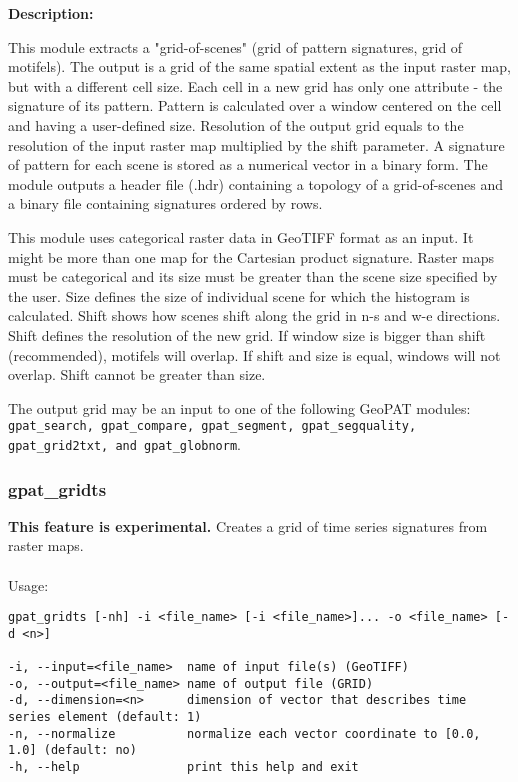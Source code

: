 {\bf Description:}

This module extracts a "grid-of-scenes" (grid of pattern signatures, grid of motifels).
The output is a grid of the same spatial extent as the input raster map, but with a different cell size.
Each cell in a new grid has only one attribute - the signature of its pattern. 
Pattern is calculated over a window centered on the cell and having a user-defined size.
Resolution of the output grid equals to the resolution of the input raster map multiplied by the shift parameter. 
A signature of pattern for each scene is stored as a numerical vector in a binary form.
The module outputs a header file (.hdr) containing a topology of a grid-of-scenes and a binary file containing signatures ordered by rows.

This module uses categorical raster data in GeoTIFF format as an input. 
It might be more than one map for the Cartesian product signature. 
Raster maps must be categorical and its size must be greater than the scene size specified by the user. 
Size defines the size of individual scene for which the histogram is calculated. 
Shift shows how scenes shift along the grid in n-s and w-e directions. 
Shift defines the resolution of the new grid.
If window size is bigger than shift (recommended), motifels will overlap.
If shift and size is equal, windows will not overlap. Shift cannot be greater than size. 

The output grid may be an input to one of the following GeoPAT modules: {\tt gpat\_search, gpat\_compare, gpat\_segment, gpat\_segquality, gpat\_grid2txt, and gpat\_globnorm}.

\subsubsection{gpat\_gridts}

\textbf{This feature is experimental.}
Creates a grid of time series signatures from raster maps.
\\\\
Usage:

\begin{minipage}{\linewidth}
\begin{lstlisting}
gpat_gridts [-nh] -i <file_name> [-i <file_name>]... -o <file_name> [-d <n>]

-i, --input=<file_name>  name of input file(s) (GeoTIFF)
-o, --output=<file_name> name of output file (GRID)
-d, --dimension=<n>      dimension of vector that describes time series element (default: 1)
-n, --normalize          normalize each vector coordinate to [0.0, 1.0] (default: no)
-h, --help               print this help and exit
\end{lstlisting}
\end{minipage}

